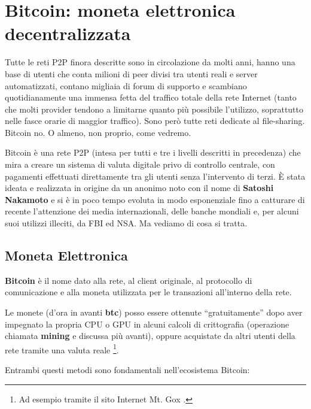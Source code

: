 \chapter{Bitcoin: moneta elettronica
decentralizzata}\label{bitcoin-moneta-elettronica-decentralizzata}

Tutte le reti P2P finora descritte sono in circolazione da molti anni,
hanno una base di utenti che conta milioni di peer divisi tra utenti
reali e server automatizzati, contano migliaia di forum di supporto e
scambiano quotidianamente una immensa fetta del traffico totale della
rete Internet (tanto che molti provider tendono a limitarne quanto più
possibile l'utilizzo, soprattutto nelle fasce orarie di maggior
traffico). Sono però tutte reti dedicate al file-sharing. Bitcoin no. O
almeno, non proprio, come vedremo.

Bitcoin è una rete P2P (intesa per tutti e tre i livelli descritti in
precedenza) che mira a creare un sistema di valuta digitale privo di
controllo centrale, con pagamenti effettuati direttamente tra gli utenti
senza l'intervento di terzi. È stata ideata e realizzata in origine da
un anonimo noto con il nome di \textbf{Satoshi Nakamoto} \cite{bitcoin}
e si è in poco tempo evoluta in modo esponenziale fino a catturare di
recente l'attenzione dei media internazionali, delle banche mondiali e,
per alcuni suoi utilizzi illeciti, da FBI ed NSA. Ma vediamo di cosa si
tratta.

\section{Moneta Elettronica}\label{moneta-elettronica}

\textbf{Bitcoin} è il nome dato alla rete, al client originale, al
protocollo di comunicazione e alla moneta utilizzata per le transazioni
all'interno della rete.

Le monete (d'ora in avanti \textbf{btc}) posso essere ottenute
``gratuitamente'' dopo aver impegnato la propria CPU o GPU in alcuni
calcoli di crittografia (operazione chiamata \textbf{mining} e discussa
più avanti), oppure acquistate da altri utenti della rete tramite una
valuta reale \footnote{Ad esempio tramite il sito Internet Mt. Gox
  \cite{mtgox}.}.

Entrambi questi metodi sono fondamentali nell'ecosistema Bitcoin:

